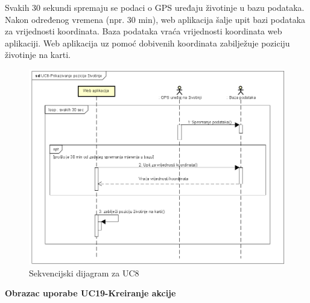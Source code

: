 				Svakih 30 sekundi spremaju se podaci o GPS uređaju životinje u bazu podataka.
				Nakon određenog vremena (npr. 30 min), web aplikacija šalje upit bazi podataka za vrijednosti koordinata. Baza podataka vraća vrijednosti koordinata web aplikaciji.  Web aplikacija uz pomoć dobivenih koordinata zabilježuje
				poziciju životinje na karti.
				\begin{figure}[H]
					\includegraphics[width=\textwidth]{slike/UC8-PrikazivanjePozicijeZivotinje.PNG} %
					\caption{Sekvencijski dijagram za UC8}
					\label{fig:UC8-PrikazivanjePozicijeZivotinje} %
				\end{figure}
				
				\vspace{60pt}
				\vspace{48pt}
				
				\textbf{Obrazac uporabe UC19-Kreiranje akcije}\\
				
